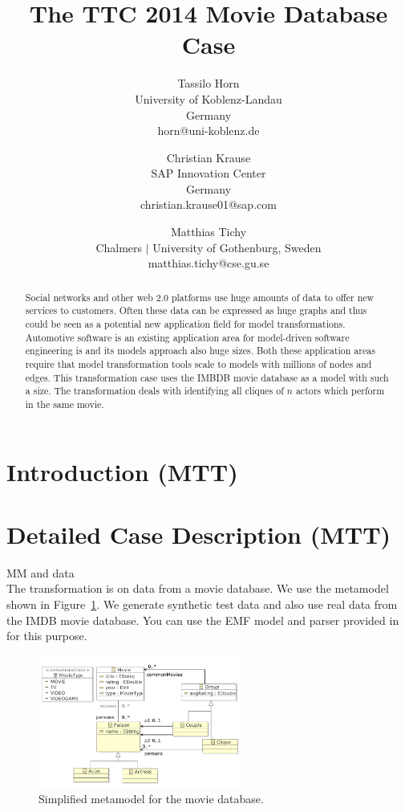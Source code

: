 \documentclass[a4paper]{article}
\title{The TTC 2014 Movie Database Case}
\author{
Tassilo Horn\\ University of Koblenz-Landau\\ Germany\\ horn@uni-koblenz.de
\and
Christian Krause\\ SAP Innovation Center\\ Germany\\ christian.krause01@sap.com
\and
Matthias Tichy\\ Chalmers $|$ University of Gothenburg, Sweden \\matthias.tichy@cse.gu.se
}
\begin{document}
\maketitle

\begin{abstract}
  Social networks and other web 2.0 platforms use huge amounts of data
  to offer new services to customers. Often these data can be
  expressed as huge graphs and thus could be seen as a potential new
  application field for model transformations. Automotive software is
  an existing application area for model-driven software engineering
  is and its models approach also huge sizes. Both these application
  areas require that model transformation tools scale to models with
  millions of nodes and edges. This transformation case uses the IMBDB
  movie database as a model with such a size. The transformation deals
  with identifying all cliques of $n$ actors which perform in the same movie.
  \end{abstract}
\vskip 32pt


\section{Introduction (MTT)}


\section{Detailed Case Description (MTT)}

MM and data\\

The transformation is on data from a movie database.
We use the metamodel shown in Figure~\ref{fig:metamodel}.
We generate synthetic test data and also use real data
from the IMDB movie database. You can use the EMF model and
parser provided in \cite{IMDB2EMF} for this purpose.


\begin{figure}[ht]
\centering
\includegraphics[width=0.6\textwidth]{movies}
\caption{Simplified metamodel for the movie database.}
\label{fig:metamodel}
\end{figure}
\end{document}
